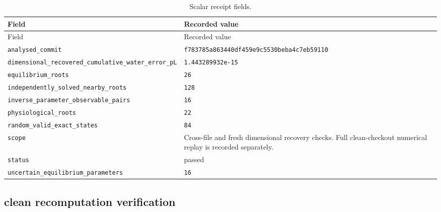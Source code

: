 \begingroup\scriptsize
\setlength{\tabcolsep}{3pt}
\begin{longtable}{p{.46\linewidth}p{.46\linewidth}}
\caption{Scalar receipt fields.}\\
\toprule
Field & Recorded value \\
\midrule\endfirsthead
\toprule
Field & Recorded value \\
\midrule\endhead
\bottomrule\endfoot
\nolinkurl{analysed_commit} & \nolinkurl{f783785a863440df459e9c5530beba4c7eb59110} \\
\nolinkurl{dimensional_recovered_cumulative_water_error_pL} & \texttt{1.443289932e-15} \\
\nolinkurl{equilibrium_roots} & \texttt{26} \\
\nolinkurl{independently_solved_nearby_roots} & \texttt{128} \\
\nolinkurl{inverse_parameter_observable_pairs} & \texttt{16} \\
\nolinkurl{physiological_roots} & \texttt{22} \\
\nolinkurl{random_valid_exact_states} & \texttt{84} \\
\nolinkurl{scope} & Cross-file and fresh dimensional recovery checks. Full clean-checkout numerical replay is recorded separately. \\
\nolinkurl{status} & passed \\
\nolinkurl{uncertain_equilibrium_parameters} & \texttt{16} \\
\end{longtable}
\endgroup



\subsection*{clean recomputation verification}

